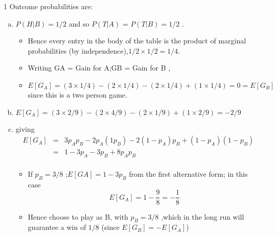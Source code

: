 \documentclass[a4paper,12pt]{article}
\begin{document}
1 Outcome probabilities are:
\begin{enumerate}[(a)]
    \item  $P(H|B) = 1/2$ and so $P(T|A)$ = $P(T|B) = 1/2$ .
\begin{itemize}
\item Hence every entry in the body of the table is the product of marginal probabilities (by
independence),$1/2 \times 1/2 = 1/4$.
\item Writing GA = Gain for A;GB = Gain for B ,
\item $E[G_A] = (3 \times 1/4) - (2 \times 1/4) - (2 \times 1/4) + (1 \times 1/4) = 0 = E[G_B]$
since this is a two person game.
\end{itemize}

\item $E[G_A] = (3 \times 2/9) - (2 \times 4/9) - (2 \times 1/9) + (1 \times 2/9) = -2/9$
\item giving 
\begin{eqnarray*}
E[G_A] &=& 3p_Ap_B - 2p_A(1  p_B) - 2(1 - p_A)p_B + (1 - p_A)(1 - p_B)\\ &=& 1 - 3p_A -
3p_B + 8p_Ap_B\\
\end{eqnarray*}
\begin{itemize}
\item If $p_B = 3/8$ ;$E[GA] = 1 - 3p_B$ from the first alternative form; in this case \[E[G_A] =
1 - \frac{9}{8}  = - \frac{1}{8}\]
\item Hence choose to play as B, with $p_B = 3/8$ ,which in the long run will guarantee a win of $1/8$
(since $E[G_B] = -E[G_A]$)
\end{itemize}
\end{enumerate}
\end{document}
